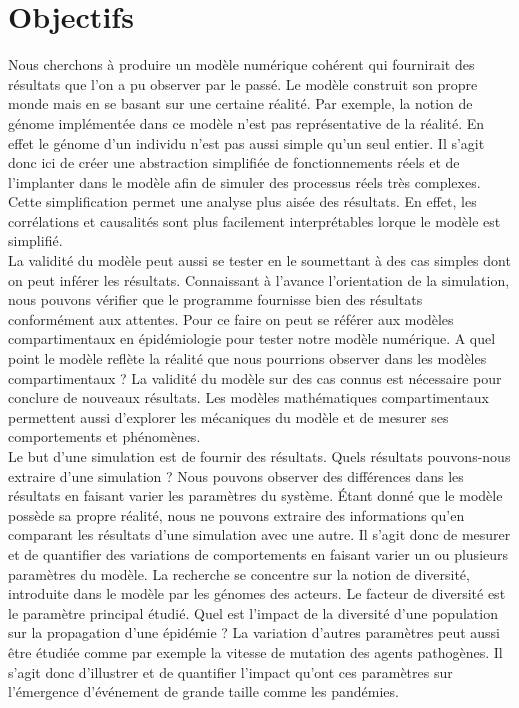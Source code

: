 \chapter{Objectifs} \label{ch:objectifs}

Nous cherchons à produire un modèle numérique cohérent qui fournirait des résultats que l'on a pu observer par le passé. Le modèle construit son propre monde mais en se basant sur une certaine réalité. Par exemple, la notion de génome implémentée dans ce modèle n'est pas représentative de la réalité. En effet le génome d'un individu n'est pas aussi simple qu'un seul entier. Il s'agit donc ici de créer une abstraction simplifiée de fonctionnements réels et de l'implanter dans le modèle afin de simuler des processus réels très complexes. Cette simplification permet une analyse plus aisée des résultats. En effet, les corrélations et causalités sont plus facilement interprétables lorque le modèle est simplifié.\\

La validité du modèle peut aussi se tester en le soumettant à des cas simples dont on peut inférer les résultats. Connaissant à l'avance l'orientation de la simulation, nous pouvons vérifier que le programme fournisse bien des résultats conformément aux attentes. Pour ce faire on peut se référer aux modèles compartimentaux en épidémiologie pour tester notre modèle numérique. A quel point le modèle reflète la réalité que nous pourrions observer dans les modèles compartimentaux ? La validité du modèle sur des cas connus est nécessaire pour conclure de nouveaux résultats. Les modèles mathématiques compartimentaux permettent aussi d'explorer les mécaniques du modèle et de mesurer ses comportements et phénomènes.\\

Le but d'une simulation est de fournir des résultats. Quels résultats pouvons-nous extraire d'une simulation ? Nous pouvons observer des différences dans les résultats en faisant varier les paramètres du système. Étant donné que le modèle possède sa propre réalité, nous ne pouvons extraire des informations qu'en comparant les résultats d'une simulation avec une autre. Il s'agit donc de mesurer et de quantifier des variations de comportements en faisant varier un ou plusieurs paramètres du modèle. La recherche se concentre sur la notion de diversité, introduite dans le modèle par les génomes des acteurs. Le facteur de diversité est le paramètre principal étudié. Quel est l'impact de la diversité d'une population sur la propagation d'une épidémie ? La variation d'autres paramètres peut aussi être étudiée comme par exemple la vitesse de mutation des agents pathogènes. Il s'agit donc d'illustrer et de quantifier l'impact qu'ont ces paramètres sur l'émergence d'événement de grande taille comme les pandémies.\\

